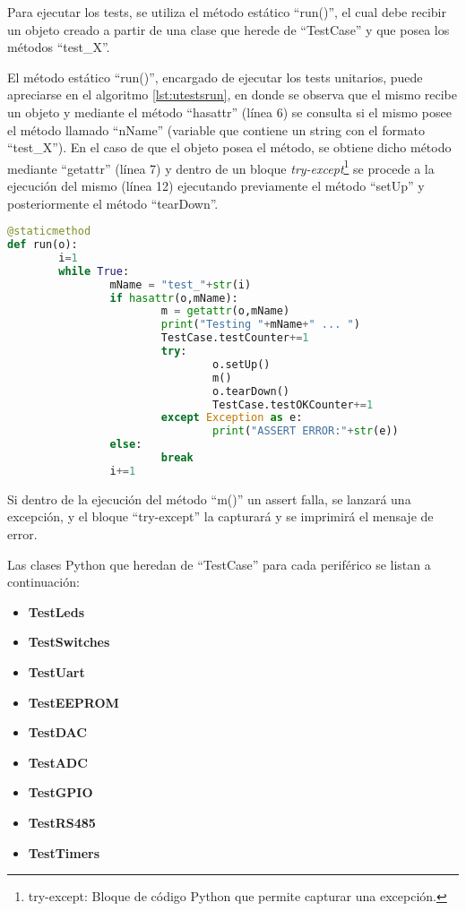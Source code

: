 Para ejecutar los tests, se utiliza el método estático “run()”, el cual debe recibir un objeto creado a partir de una clase que herede de “TestCase” y que posea los métodos “test\_X”.

El método estático “run()”, encargado de ejecutar los tests unitarios, puede apreciarse en el algoritmo \ref{lst:utestsrun}, en donde se observa que el mismo recibe un objeto y mediante el método “hasattr” (línea 6) se consulta si el mismo posee el método llamado “nName” (variable que contiene un string con el formato “test\_X”). En el caso de que el objeto posea el método, se obtiene dicho método mediante “getattr” (línea 7) y dentro de un bloque \textit{try-except}\footnote{try-except: Bloque de código Python que permite capturar una excepción.} se procede a la ejecución del mismo (línea 12) ejecutando previamente el método “setUp” y posteriormente el método “tearDown”.

\begin{lstlisting}[label={lst:utestsrun},caption=Método que ejecuta los métodos de test en la biblioteca unittest.py implementada., language={python}]
@staticmethod
def run(o):
		i=1
		while True:
				mName = "test_"+str(i)
				if hasattr(o,mName):
						m = getattr(o,mName)
						print("Testing "+mName+" ... ")
						TestCase.testCounter+=1
						try:
								o.setUp()
								m()
								o.tearDown()
								TestCase.testOKCounter+=1
						except Exception as e:
								print("ASSERT ERROR:"+str(e))
				else:
						break
				i+=1
\end{lstlisting}

Si dentro de la ejecución del método “m()” un assert falla, se lanzará una excepción, y el bloque “try-except” la capturará y se imprimirá el mensaje de error.

Las clases Python que heredan de “TestCase” para cada periférico se listan a continuación:

\begin{itemize}
	\item \textbf{TestLeds}
	\item \textbf{TestSwitches}
	\item \textbf{TestUart}
	\item \textbf{TestEEPROM}
	\item \textbf{TestDAC}
	\item \textbf{TestADC}
	\item \textbf{TestGPIO}
	\item \textbf{TestRS485}	
	\item \textbf{TestTimers}
\end{itemize}

